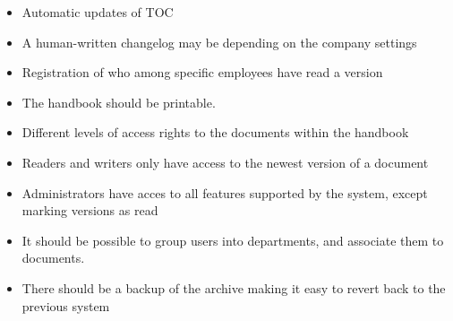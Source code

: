 \begin{itemize}
\item
Automatic updates of TOC
\item
A human-written changelog may be depending on the company settings
\item
Registration of who among specific employees have read a version
\item
The handbook should be printable.
\item
Different levels of access rights to the documents within the handbook
\item
Readers and writers only have access to the newest version of a document
\item
Administrators have acces to all features supported by the system, except marking versions as read
\item
It should be possible to group users into departments, and associate them to documents.
\item
There should be a backup of the archive making it easy to revert back to the previous system
\end{itemize}

